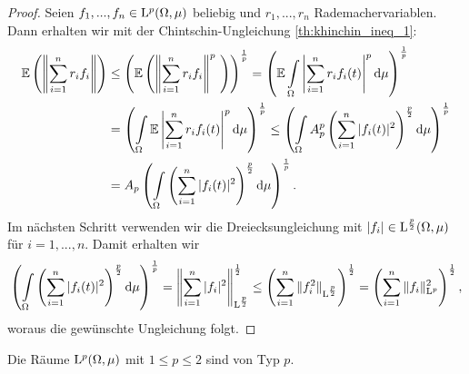 \begin{proof}
Seien $ f_1,...,f_n \in \mathrm{L}^p(\Omega,\mu) $ beliebig und $ r_1,...,r_n $ Rademachervariablen.
Dann erhalten wir mit der Chintschin-Ungleichung \ref{th:khinchin_ineq_1}:
\begin{equation*}
	\begin{split}
		\mathbb{E}
		\left(
		\left\|
		\sum \limits_{i=1}^n r_i f_i
		\right\|
		\right)
		&\leq
		\left( 
		\mathbb{E}
		\left(
		\left\|
		\sum \limits_{i = 1}^n
		r_i f_i
		\right\|^p \ 
		\right)
		\right)^\frac{1}{p}
		=
		\left( 
		\mathbb{E}
		\int \limits_{\Omega} 
		\left| 
		\sum \limits_{i = 1}^n
		r_i f_i(t)
		\right|^p
		\dx{\mu}
		\right)^\frac{1}{p}\\
		&=
		\left(
		\int \limits_{\Omega}
		\mathbb{E}
		\left|
		\sum \limits_{i = 1}^n
		r_i f_i(t)
		\right|^p
		\dx{\mu}
		\right)^\frac{1}{p}
		\leq
		\left(
		\int \limits_{\Omega}
		A_p^p
		\left(
		\sum \limits_{i = 1}^n
		|f_i(t)|^2
		\right)^\frac{p}{2}
		\dx{\mu}
		\right)^\frac{1}{p}\\
		&=
		A_p
		\left(
		\int \limits_{\Omega}
		\left(
		\sum \limits_{i = 1}^n
		|f_i(t)|^2
		\right)^\frac{p}{2}
		\dx{\mu}
		\right)^\frac{1}{p}.
	\end{split}	
\end{equation*}
Im nächsten Schritt verwenden wir die Dreiecksungleichung mit $ |f_i| \in \mathrm{L}^{\frac{p}{2}}(\Omega,\mu) $ für $ i = 1,...,n $.
Damit erhalten wir
\begin{align*}
	\left(
	\int \limits_{\Omega}
	\left(
	\sum \limits_{i = 1}^n
	|f_i(t)|^2
	\right)^\frac{p}{2}
	\mathrm{d}\mu
	\right)^\frac{1}{p}
	=
	\left\|
	\sum \limits_{i = 1}^n |f_i|^2
	\right\|_{\mathrm{L}^{\frac{p}{2}}}^\frac{1}{2}
	\leq
	\left(
	\sum \limits_{i = 1}^n 
	\| f_i^2 \|_{\mathrm{L}^\frac{p}{2}}
	\right)^\frac{1}{2}
	=
	\left(
	\sum \limits_{i = 1}^n 
	\| f_i \|_{\mathrm{L}^p}^2
	\right)^\frac{1}{2} ,
\end{align*}
woraus die gewünschte Ungleichung folgt. 
\end{proof}
\begin{sz}\label{th:Lp_typep}
	Die Räume $ \mathrm{L}^p(\Omega,\mu) $ mit $ 1 \leq p \leq  2 $ sind von Typ $ p $.
\end{sz}
